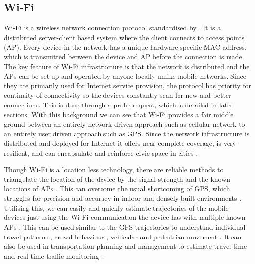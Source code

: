 \subsection{Wi-Fi}

Wi-Fi is a wireless network connection protocol standardised by \citet{ieee2016}.
It is a distributed server-client based system where the client connects to access points (AP).
Every device in the network has a unique hardware specific MAC address, which is transmitted between the device and AP before the connection is made.
The key feature of Wi-Fi infrastructure is that the network is distributed and the APs can be set up and operated by anyone locally unlike mobile networks.
Since they are primarily used for Internet service provision, the protocol has priority for continuity of connectivity so the devices constantly scan for new and better connections.
This is done through a probe request, which is detailed in later sections.
With this background we can see that Wi-Fi provides a fair middle ground between an entirely network driven approach such as cellular network to an entirely user driven approach such as GPS.
Since the network infrastructure is distributed and deployed for Internet it offers near complete coverage, is very resilient,  and can encapsulate and reinforce civic space in cities \cite{torrens2008}.

Though Wi-Fi is a location less technology, there are reliable methods to triangulate the location of the device by the signal strength and the known locations of APs \citep{he2003, moore2004, lamarca2005, dinesh2017, lin2018}.
This can overcome the usual shortcoming of GPS, which struggles for precision and accuracy in indoor and densely built environments \citep{zarim2006, kawaguchi2009, xi2010}.
Utilising this, we can easily and quickly estimate trajectories of the mobile devices just using the Wi-Fi communication the device has with multiple known APs \citep{xu2013}.
This can be used similar to the GPS trajectories to understand individual travel patterns \citep{kim2006, rekimoto2007, sap2015}, crowd behaviour \citep{abedi2013, mowafi2013, shu2017}, vehicular \citep{lu2010} and pedestrian movement \citep{xu2013, fukuzaki2014, wang2016, taylor2019}.
It can also be used in transportation planning and management to estimate travel time \citep{musa2011, haakegaard2018} and real time traffic monitoring \citep{abbott-jard2013}.

